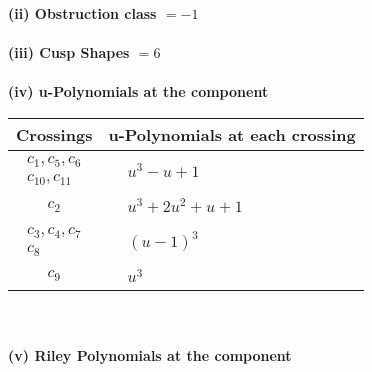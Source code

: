 \documentclass[1p]{elsarticle_modified}
\theoremstyle{definition}
\begin{document}
\flushleft \textbf{(ii) Obstruction class $= -1$}\\~\\
\flushleft \textbf{(iii) Cusp Shapes $= 6$}\\~\\
\newpage\renewcommand{\arraystretch}{1}
\flushleft \textbf{(iv) u-Polynomials at the component}\newline \\
\begin{tabular}{m{50pt}|m{274pt}}
Crossings & \hspace{64pt}u-Polynomials at each crossing \\
\hline $$\begin{aligned}c_{1},c_{5},c_{6}\\c_{10},c_{11}\end{aligned}$$&$\begin{aligned}
&u^3- u+1
\end{aligned}$\\
\hline $$\begin{aligned}c_{2}\end{aligned}$$&$\begin{aligned}
&u^3+2 u^2+u+1
\end{aligned}$\\
\hline $$\begin{aligned}c_{3},c_{4},c_{7}\\c_{8}\end{aligned}$$&$\begin{aligned}
&(u-1)^3
\end{aligned}$\\
\hline $$\begin{aligned}c_{9}\end{aligned}$$&$\begin{aligned}
&u^3
\end{aligned}$\\
\hline
\end{tabular}\\~\\
\newpage\renewcommand{\arraystretch}{1}
\flushleft \textbf{(v) Riley Polynomials at the component}\newline \\
\end{document}
